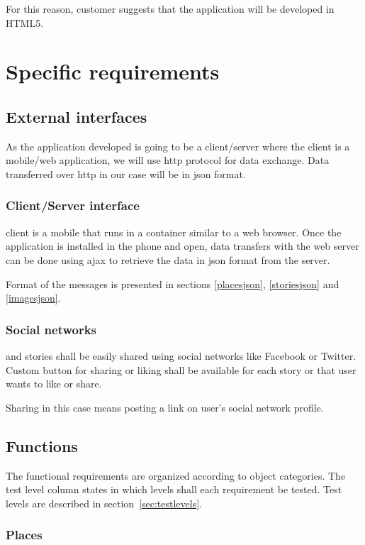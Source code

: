 \documentclass[11pt]{book}
\begin{document}
For this reason, customer suggests that the application will be developed in HTML5.

\section{Specific requirements}\label{sec:req_specific_requirements}

\subsection{External interfaces}
As the application developed is going to be a client/server where the client is a mobile/web application, we will use \gls{http} protocol for data exchange. Data transferred over \gls{http} in our case will be in \gls{json} format.

\subsubsection{\systemname Client/Server interface}
\systemname client is a mobile that runs in a container similar to a web browser. Once the application is installed in the phone and open, data transfers with the web server can be done using \gls{ajax} to retrieve the data in \gls{json} format from the server.

Format of the messages is presented in sections \ref{placesjson}, \ref{storiesjson} and \ref{imagesjson}.

\subsubsection{Social networks}\label{sec:req_social_networks}
\wallentitypcap and stories shall be easily shared using social networks like Facebook or Twitter. Custom button for sharing or liking shall be available for each story or \wallentitys that user wants to like or share.

Sharing in this case means posting a link on user's social network profile.

\subsection{Functions}\label{sec:functionalreq}
The functional requirements are organized according to object categories. The test level column states in which levels shall each requirement be tested. Test levels are described in section~\ref{sec:testlevels}.

\subsubsection{Places}
\end{document}
